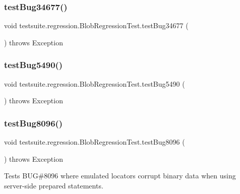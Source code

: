 \subsubsection{\texorpdfstring{test\+Bug34677()}{testBug34677()}}
{\footnotesize\ttfamily void testsuite.\+regression.\+Blob\+Regression\+Test.\+test\+Bug34677 (\begin{DoxyParamCaption}{ }\end{DoxyParamCaption}) throws Exception}

\mbox{\label{classtestsuite_1_1regression_1_1_blob_regression_test_adbc904fc8caf8de0ac099afb41d6daa6}} 
\subsubsection{\texorpdfstring{test\+Bug5490()}{testBug5490()}}
{\footnotesize\ttfamily void testsuite.\+regression.\+Blob\+Regression\+Test.\+test\+Bug5490 (\begin{DoxyParamCaption}{ }\end{DoxyParamCaption}) throws Exception}

\mbox{\label{classtestsuite_1_1regression_1_1_blob_regression_test_aff4364ccb7977bcf4f76faf8ebd1a8b2}} 
\subsubsection{\texorpdfstring{test\+Bug8096()}{testBug8096()}}
{\footnotesize\ttfamily void testsuite.\+regression.\+Blob\+Regression\+Test.\+test\+Bug8096 (\begin{DoxyParamCaption}{ }\end{DoxyParamCaption}) throws Exception}

Tests B\+UG\#8096 where emulated locators corrupt binary data when using server-\/side prepared statements.


